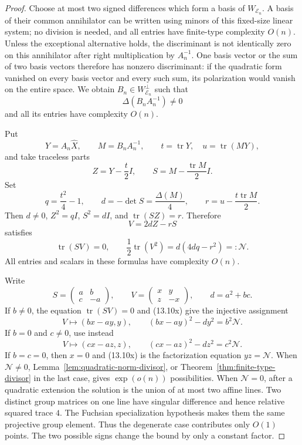 \documentclass[11pt,reqno]{amsart}
\theoremstyle{definition}
\theoremstyle{remark}
\newcommand{\Tr}{\operatorname{tr}}
\begin{document}
\begin{proof}
Choose at most two signed differences which form a basis of
\(W_{\mathcal E_n}\).  A basis of their common annihilator can be written
using minors of this fixed-size linear system; no division is needed, and
all entries have finite-type complexity \(O(n)\).  Unless the exceptional
alternative holds, the discriminant is not identically zero on this
annihilator after right multiplication by \(A_n^{-1}\).  One basis vector
or the sum of two basis vectors therefore has nonzero discriminant: if the
quadratic form vanished on every basis vector and every such sum, its
polarization would vanish on the entire space.  We obtain
\(B_n\in W_{\mathcal E_n}^\perp\) such that
\[
 \Delta(B_nA_n^{-1})\ne0
\]
and all its entries have complexity \(O(n)\).

Put
\[
 Y=A_n\widehat X,\qquad M=B_nA_n^{-1},\qquad
 t=\Tr Y,\quad u=\Tr(MY),
\]
and take traceless parts
\[
 Z=Y-\frac t2I,
 \qquad S=M-\frac{\Tr M}{2}I.
\]
Set
\[
 q=\frac{t^2}{4}-1,\qquad
 d=-\det S=\frac{\Delta(M)}4,\qquad
 r=u-\frac{t\Tr M}{2}.
\]
Then \(d\ne0\), \(Z^2=qI\), \(S^2=dI\), and \(\Tr(SZ)=r\).  Therefore
\[
 V=2dZ-rS
\]
satisfies
\[
 \Tr(SV)=0,
 \qquad \frac12\Tr(V^2)=d(4dq-r^2)=:\mathcal N.
\tag{13.10x}
\]
All entries and scalars in these formulas have complexity \(O(n)\).

Write
\[
 S=\begin{pmatrix}a&b\\c&-a\end{pmatrix},
 \qquad
 V=\begin{pmatrix}x&y\\z&-x\end{pmatrix},
 \qquad d=a^2+bc.
\]
If \(b\ne0\), the equation \(\Tr(SV)=0\) and (13.10x) give the injective
assignment
\[
 V\longmapsto(bx-ay,y),
 \qquad (bx-ay)^2-dy^2=b^2\mathcal N.
\]
If \(b=0\) and \(c\ne0\), use instead
\[
 V\longmapsto(cx-az,z),
 \qquad (cx-az)^2-dz^2=c^2\mathcal N.
\]
If \(b=c=0\), then \(x=0\) and (13.10x) is the factorization equation
\(yz=\mathcal N\).  When \(\mathcal N\ne0\),
Lemma~\ref{lem:quadratic-norm-divisor}, or
Theorem~\ref{thm:finite-type-divisor} in the last case, gives
\(\exp(o(n))\) possibilities.  When \(\mathcal N=0\), after a quadratic
extension the solution is the union of at most two affine lines.  Two
distinct group matrices on one line have singular difference and hence
relative squared trace \(4\).  The Fuchsian specialization hypothesis
makes them the same projective group element.  Thus the degenerate case
contributes only \(O(1)\) points.  The two possible signs change the bound
by only a constant factor.
\end{proof}
\end{document}
